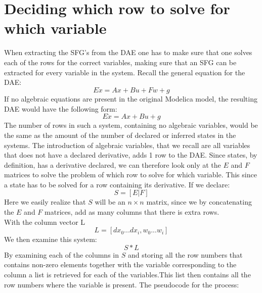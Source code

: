 
\section{Deciding which row to solve for which variable}
When extracting the SFG's from the DAE one has to make sure that one solves each of the rows for the correct variables, making sure that an SFG can be extracted for every variable in the system. Recall the general equation for the DAE:
\begin{equation}
E\dot{x} = Ax + Bu + Fw + g
\end{equation}
If no algebraic equations are present in the original Modelica model, the resulting DAE would have the following form:
\begin{equation}
E\dot{x} = Ax + Bu + g
\end{equation}
The number of rows in such a system, containing no algebraic variables, would be the same as the amount of the number of declared or inferred states in the systems. The introduction of algebraic variables, that we recall are all variables that does not have a declared derivative, adds 1 row to the DAE. Since states, by definition, has a derivative declared, we can therefore look only at the $E$ and $F$ matrices to solve the problem of which row to solve for which variable. This since a state has to be solved for a row containing its derivative. If we declare:
\begin{equation}
S=[E|F]
\end{equation}
Here we easily realize that $S$ will be an $n \times n$ matrix, since we by concatenating the $E$ and $F$ matrices, add as many columns that there is extra rows.\\
With the column vector L
\begin{equation}
L=[dx_0...dx_i, w_0...w_i]
\end{equation}
We then examine this system:
\begin{equation}
S*L
\end{equation}
By examining each of the columns in $S$ and storing all the row numbers that contains non-zero elements together with the variable corresponding to the column a list is retrieved for each of the variables.This  list then contains all the row numbers where the variable is present.
The pseudocode for the process:

